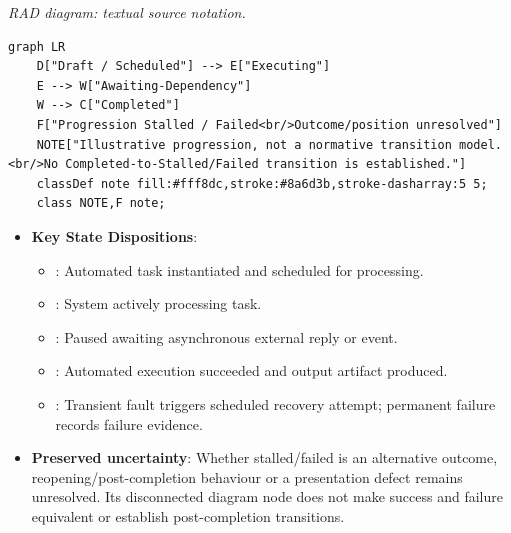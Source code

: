 \textit{RAD diagram: textual source notation.}
\begin{Verbatim}[breaklines,fontsize=\footnotesize]
graph LR
    D["Draft / Scheduled"] --> E["Executing"]
    E --> W["Awaiting-Dependency"]
    W --> C["Completed"]
    F["Progression Stalled / Failed<br/>Outcome/position unresolved"]
    NOTE["Illustrative progression, not a normative transition model.<br/>No Completed-to-Stalled/Failed transition is established."]
    classDef note fill:#fff8dc,stroke:#8a6d3b,stroke-dasharray:5 5;
    class NOTE,F note;
\end{Verbatim}
\label{rad:processes:337}

\begin{itemize}

\item
\textbf{Key State Dispositions}:


\begin{itemize}

\item
\texttt{}: Automated task instantiated and scheduled for processing.



\item
\texttt{}: System actively processing task.



\item
\texttt{}: Paused awaiting asynchronous external reply or event.



\item
\texttt{}: Automated execution succeeded and output artifact produced.



\item
\texttt{}: Transient fault triggers scheduled recovery attempt; permanent failure records failure evidence.



\end{itemize}


\item
\textbf{Preserved uncertainty}: Whether stalled/\allowbreak{}failed is an alternative outcome, reopening/\allowbreak{}post-completion behaviour or a presentation defect remains unresolved. Its disconnected diagram node does not make success and failure equivalent or establish post-completion transitions.



\end{itemize}
\label{rad:processes:345}

